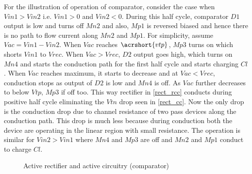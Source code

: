 \documentclass[12pt,a4paper,UKenglish]{article}
\begin{document}
For the illustration of operation of comparator, consider the case when $Vin1 > Vin2$ i.e. $Vin1 > 0$ and $Vin2 < 0$. During this half cycle, comparator $D1$ output is low and turns off $Mn2$ and also, $Mp1$ is reversed biased and hence there is no path to flow current along $Mn2$ and $Mp1$. For simplicity, assume $Vac =  Vin1 - Vin2$. When $Vac$ reaches $\acrshort{vtp}$, $Mp3$ turns on which shorts $Vin1$ to $Vrec$. When $Vac > Vrec$, $D2$ output goes high, which turns on $Mn4$ and starts the conduction path for the first half cycle and starts charging $Cl$. When $Vac$ reaches maximum, it starts to decrease and at $Vac < Vrec$, conduction stops as output of $D2$ is low and $Mn4$ is off. As $Vac$ further decreases to below $Vtp$, $Mp3$ if off too. This way rectifier in \ref{rect_rcc}  conducts during positive half cycle eliminating the $Vtn$ drop seen in \ref{rect_cc}. Now the only drop is the conduction drop due to channel resistance of two pass devices along the conduction path. This drop is much less because during conduction both the device are operating in the linear region with small resistance. The operation is similar for $Vin2 > Vin1$ where $Mn4$ and $Mp3$ are off and $Mn2$ and $Mp1$ conduct to charge $Cl$. 

\begin{figure} [H]
  \centering 
\hfill
 \caption{Active rectifier and active circuitry (comparator)} 
\label{rect_rcc_rcc} 
\end{figure}
\end{document}
